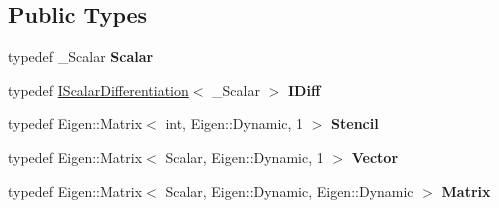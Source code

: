 \subsection*{Public Types}
\begin{DoxyCompactItemize}
\item 
typedef \+\_\+\+Scalar {\bfseries Scalar}\hypertarget{classow__core_1_1ScalarFiniteDifference_ab758636d19d295f8174db08b7229dee3}{}\label{classow__core_1_1ScalarFiniteDifference_ab758636d19d295f8174db08b7229dee3}

\item 
typedef \hyperlink{classow__core_1_1IScalarDifferentiation}{I\+Scalar\+Differentiation}$<$ \+\_\+\+Scalar $>$ {\bfseries I\+Diff}\hypertarget{classow__core_1_1ScalarFiniteDifference_a139331f353b64b422d806abd41c48ced}{}\label{classow__core_1_1ScalarFiniteDifference_a139331f353b64b422d806abd41c48ced}

\item 
typedef Eigen\+::\+Matrix$<$ int, Eigen\+::\+Dynamic, 1 $>$ {\bfseries Stencil}\hypertarget{classow__core_1_1ScalarFiniteDifference_a865e1c5f9ea342a4c9051a8079f85be6}{}\label{classow__core_1_1ScalarFiniteDifference_a865e1c5f9ea342a4c9051a8079f85be6}

\item 
typedef Eigen\+::\+Matrix$<$ Scalar, Eigen\+::\+Dynamic, 1 $>$ {\bfseries Vector}\hypertarget{classow__core_1_1ScalarFiniteDifference_aa50f89026a2c9c7f6ed4b89720947e79}{}\label{classow__core_1_1ScalarFiniteDifference_aa50f89026a2c9c7f6ed4b89720947e79}

\item 
typedef Eigen\+::\+Matrix$<$ Scalar, Eigen\+::\+Dynamic, Eigen\+::\+Dynamic $>$ {\bfseries Matrix}\hypertarget{classow__core_1_1ScalarFiniteDifference_a760bfc15403ba0eaf4cb4c476fb970f9}{}\label{classow__core_1_1ScalarFiniteDifference_a760bfc15403ba0eaf4cb4c476fb970f9}

\end{DoxyCompactItemize}
